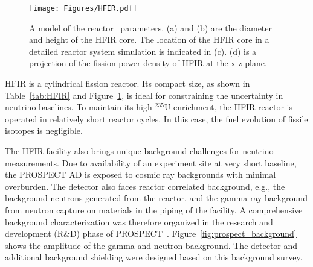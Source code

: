 \begin{figure}[h!]
    \centering
    \texttt{[image: Figures/HFIR.pdf]}
    \caption[The dimensions and power distribution of HFIR]{A model of the reactor~\cite{bib:prospect_nim} parameters.
     (a) and (b) are the diameter and height of the HFIR core.
    The location of the HFIR core in a detailed reactor system simulation is indicated in (c).
    (d) is a projection of the fission power density of HFIR at the x-z plane.}
    \label{fig:HFIR}
\end{figure}

    HFIR is a cylindrical fission reactor.
    Its compact size, as shown in Table~\ref{tab:HFIR} and Figure~\ref{fig:HFIR}, is ideal for constraining the uncertainty in neutrino baselines.
    To maintain its high $^{235}$U enrichment, the HFIR reactor is operated in relatively short reactor cycles.
    In this case, the fuel evolution of fissile isotopes is negligible.
    
    The HFIR facility also brings unique background challenges for neutrino measurements. 
    Due to availability of an experiment site at very short baseline, the PROSPECT AD is exposed to cosmic ray backgrounds with minimal overburden. 
    The detector also faces reactor correlated background, e.g., the background neutrons generated from the reactor, and the gamma-ray background from neutron capture on materials in the piping of the facility.
    A comprehensive background characterization was therefore organized in the research and development (R\&D) phase of PROSPECT~\cite{bib:prospect_background}. 
    Figure~\ref{fig:prospect_background} shows the amplitude of the gamma and neutron background.
    The detector and additional background shielding were designed based on this background survey.
    
